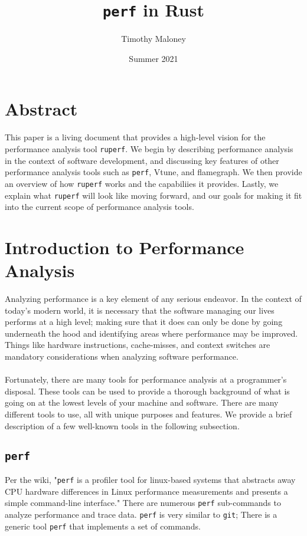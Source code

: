 \documentclass{article}
\title{\texttt{perf} in Rust}
\author{Timothy Maloney}
\date{Summer 2021}
\begin{document}
\maketitle
\section*{Abstract}
This paper is a living document that provides a high-level vision for the performance analysis tool \texttt{ruperf}.
We begin by describing performance analysis in the context of software development, and discussing key features of other 
performance analysis tools such as \texttt{perf}, Vtune, and flamegraph. We then provide an overview of how \texttt{ruperf} works
and the capabiliies it provides. Lastly, we explain what \texttt{ruperf} will look like moving forward, and our goals for making it 
fit into the current scope of performance analysis tools.
\pagebreak
\section{Introduction to Performance Analysis}
Analyzing performance is a key element of any serious endeavor. In the context of today's modern world, it is necessary
that the software managing our lives performs at a high level; making sure that it does can only be done by going underneath the hood 
and identifying areas where performance may be improved. Things like hardware instructions, cache-misses,
and context switches are mandatory considerations when analyzing software performance.
\\\\
Fortunately, there are many tools for performance analysis at a programmer's disposal. These tools can be used to provide a
thorough background of what is going on at the lowest levels of your machine and software. There are many different tools to use, all with
unique purposes and features. We provide a brief description of a few well-known tools in the following subsection.
\subsection{\texttt{perf}}
Per the wiki, "\texttt{perf} is a profiler tool for linux-based systems that abstracts away CPU hardware differences in Linux performance measurements and presents a simple command-line interface." There are numerous \texttt{perf} sub-commands to analyze performance and trace data. \texttt{perf} is very similar to \texttt{git}; There is a generic tool \texttt{perf} that
implements a set of commands.
\end{document}
